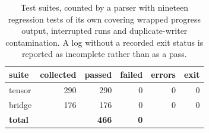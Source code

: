 \begin{table}[t]
\centering
\small
\begin{tabular}{lrrrrr}
\hline
suite & collected & passed & failed & errors & exit \\
\hline
tensor & 290 & 290 & 0 & 0 & 0 \\
bridge & 176 & 176 & 0 & 0 & 0 \\
\textbf{total} & & \textbf{466} & \textbf{0} & &  \\
\hline
\end{tabular}
\caption{Test suites, counted by a parser with nineteen regression tests of its own covering wrapped progress output, interrupted runs and duplicate-writer contamination. A log without a recorded exit status is reported as incomplete rather than as a pass.}
\label{tab:tests}
\end{table}
